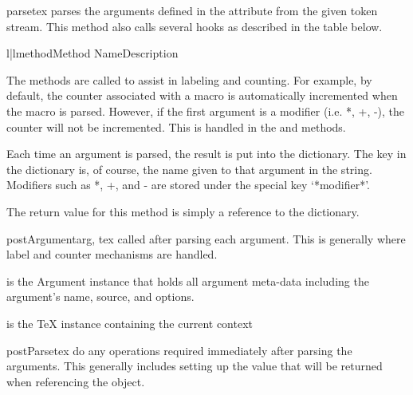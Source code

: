 \begin{methoddesc}[Macro]{parse}{tex}
parses the arguments defined in the  attribute from the given
token stream.  This method also calls several hooks as described in the table
below.

\begin{tableii}{l|l}{method}{Method Name}{Description}
\end{tableii}

The methods are called to assist in labeling and counting.  For example,
by default, the counter associated with a macro is automatically incremented
when the macro is parsed.  However, if the first argument is a modifier 
(i.e. *, +, -), the counter will not be incremented.  This is handled 
in the  and  methods.

Each time an argument is parsed, the result is put into the 
dictionary.  The key in the dictionary is, of course, the name given to that
argument in the  string.  Modifiers such as *, +, and - are
stored under the special key `*modifier*'.

The return value for this method is simply a reference to the 
 dictionary.

\end{methoddesc}

\begin{methoddesc}[Macro]{postArgument}{arg, tex}
called after parsing each argument. This is generally where label and
counter mechanisms are handled.

 is the Argument instance that holds all argument meta-data
    including the argument's name, source, and options.

 is the TeX instance containing the current context 
\end{methoddesc}

\begin{methoddesc}[Macro]{postParse}{tex}
do any operations required immediately after parsing the arguments.  This
generally includes setting up the value that will be returned when 
referencing the object.
\end{methoddesc}

